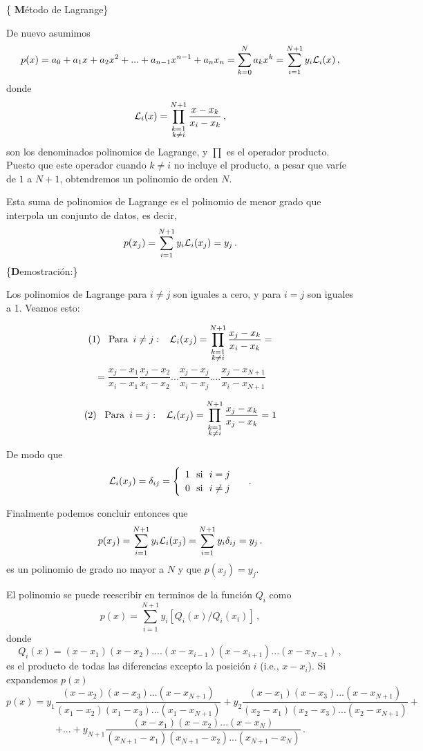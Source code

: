 \documentclass[
]{agujournal2019}
\begin{document}
\vspace{0.5cm}

\{ \textbf Método de Lagrange\}

De nuevo asumimos
\[p(x)=a_0 + a_1 x + a_2 x^2 + ... + a_{n-1}x^{n-1} + a_n x_n=\sum\limits^{N}_{k=0} a_k x^k
=\sum^{N+1}_{i=1} y_i {\cal L}_i(x)\,,\] donde
\[{\cal L}_i(x)=\prod^{N+1}_{\substack{k=1\\ k\ne i}} \frac{x-x_k}{x_i-x_k}\,,\]
son los denominados polinomios de Lagrange, y \(\prod\) es el operador
producto. Puesto que este operador cuando \(k\ne i\) no incluye el
producto, a pesar que varíe de \(1\) a \(N+1\), obtendremos un polinomio
de orden \(N\).

Esta suma de polinomios de Lagrange es el polinomio de menor grado que
interpola un conjunto de datos, es decir,
\[p(x_j)=\sum^{N+1}_{i=1} y_i {\cal L}_i(x_j)=y_j\,.\]
\{\textbf Demostración:\}

Los polinomios de Lagrange para \(i\ne j\) son iguales a cero, y para
\(i=j\) son iguales a 1. Veamos esto:

\[{\rm (1)}\,\,\,\,\,{\rm Para}\,\,\,{i \ne j}:\,\,\,\,\,{\cal L}_i(x_j)=\prod^{N+1}_{\substack{k=1\\ k\ne i}} \frac{x_j-x_k}{x_i-x_k}=\]
\[=\frac{x_j-x_1}{x_i-x_1} \frac{x_j-x_2}{x_i-x_2} ...\frac{x_j-x_j}{x_i-x_j}....\frac{x_j-x_{N+1}}{x_i-x_{N+1}}\]

\[{\rm (2)}\,\,\,\,\,{\rm Para}\,\,\,{i = j}:\,\,\,\,\,{\cal L}_i(x_j)=\prod^{N+1}_{\substack{k=1\\ k\ne i}} \frac{x_j-x_k}{x_j-x_k}=1\]

De modo que \[{\cal L}_i(x_j)=\delta_{ij}=\begin{cases}
\begin{array}{c}
   1 \,\,\,\,\text{si}\,\,\,\,i= j\\
   0 \,\,\,\,\text{si}\,\,\,\,i\ne j\\
\end{array}
\end{cases}\,.\]

Finalmente podemos concluir entonces que
\[p(x_j)=\sum^{N+1}_{i=1} y_i {\cal L}_i(x_j)=\sum^{N+1}_{i=1} y_i \delta_{ij}=y_j\,.\]
es un polinomio de grado no mayor a \(N\) y que \(p(x_j)=y_j\).

El polinomio se puede reescribir en terminos de la función \(Q_i\) como
\[p(x)=\sum^{N+1}_{i=1} y_i[Q_i(x)/Q_i(x_i)]\,,\] donde
\[Q_i(x)=(x-x_1)(x-x_2)....(x-x_{i-1})(x-x_{i+1})...(x-x_{N-1})\,,\] es
el producto de todas las diferencias excepto la posición \(i\) (i.e.,
\(x-x_{i}\)). Si expandemos \(p(x)\)
\[p(x)=y_1\frac{(x-x_2)(x-x_3)...(x-x_{N+1})}{(x_1-x_2)(x_1-x_3)...(x_1-x_{N+1})} +
       y_2\frac{(x-x_1)(x-x_3)...(x-x_{N+1})}{(x_2-x_1)(x_2-x_3)...(x_2-x_{N+1})} +\]
\[+...+y_{N+1}\frac{(x-x_1)(x-x_2)...(x-x_{N})}{(x_{N+1}-x_1)(x_{N+1}-x_2)...(x_{N+1}-x_{N})}\,.\]
\end{document}
